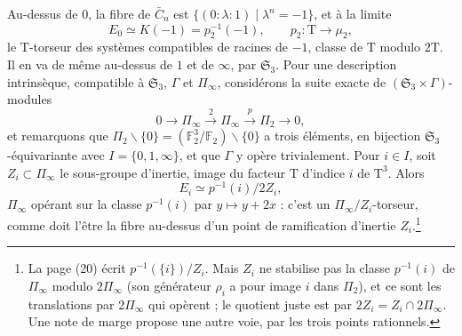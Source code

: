 \documentclass[11pt,a4paper]{article}
\begin{document}
Au-dessus de $0$, la fibre de $\bar{C}_{n}$ est
$\{(0 : \lambda : 1) \mid \lambda^{n} = -1\}$, et à la limite
\[
E_{0} \simeq K(-1) = p_{2}^{-1}(-1), \qquad p_{2} : \mathrm{T} \to \mu_{2},
\]
le $\mathrm{T}$-torseur des systèmes compatibles de racines de $-1$,
classe de $\mathrm{T}$ modulo $2\mathrm{T}$. Il en va de même au-dessus de
$1$ et de $\infty$, par $\mathfrak{S}_{3}$. Pour une description intrinsèque,
compatible à $\mathfrak{S}_{3}$, $\Gamma$ et $\Pi_{\infty}$, considérons la suite
exacte de $(\mathfrak{S}_{3} \times \Gamma)$-modules
\[
0 \to \Pi_{\infty} \xrightarrow{\;2\;} \Pi_{\infty} \xrightarrow{\;p\;} \Pi_{2} \to 0,
\]
et remarquons que $\Pi_{2} \smallsetminus \{0\} = (\mathbb{F}_{2}^{3}/\mathbb{F}_{2})
\smallsetminus \{0\}$ a trois éléments, en bijection $\mathfrak{S}_{3}$-équivariante
avec $I = \{0, 1, \infty\}$, et que $\Gamma$ y opère trivialement. Pour $i \in
I$, soit $Z_{i} \subset \Pi_{\infty}$ le sous-groupe d'inertie, image du facteur
$\mathrm{T}$ d'indice $i$ de $\mathrm{T}^{3}$. Alors
\[
E_{i} \simeq p^{-1}(i)/2Z_{i},
\]
$\Pi_{\infty}$ opérant sur la classe $p^{-1}(i)$ par $y \mapsto y + 2x$ : c'est
un $\Pi_{\infty}/Z_{i}$-torseur, comme doit l'être la fibre au-dessus d'un
point de ramification d'inertie $Z_{i}$.\footnote{La page (20) écrit
$p^{-1}(\{i\})/Z_{i}$. Mais $Z_{i}$ ne stabilise pas la classe $p^{-1}(i)$ de
$\Pi_{\infty}$ modulo $2\Pi_{\infty}$ (son générateur $\rho_{i}$ a pour image $i$
dans $\Pi_{2}$), et ce sont les translations par $2\Pi_{\infty}$ qui opèrent ;
le quotient juste est par $2Z_{i} = Z_{i} \cap 2\Pi_{\infty}$. Une note de marge
propose une autre voie, par les trois points rationnels.}
\end{document}
